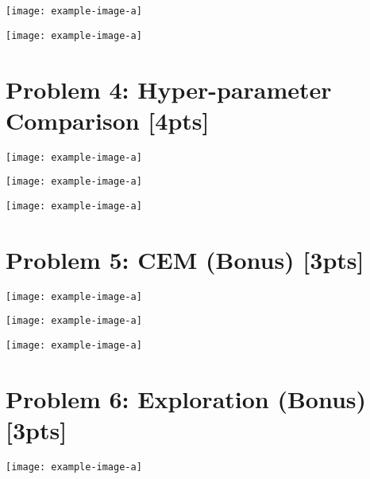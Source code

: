 \documentclass{article}
\begin{document}
\begin{answer}[title=Plot 2,height=9.5cm,width=\linewidth]
\centering
\texttt{[image: example-image-a]}
\end{answer}

\begin{answer}[title=Plot 3,height=9.5cm,width=\linewidth]
\centering
\texttt{[image: example-image-a]}
\end{answer}

\section{Problem 4: Hyper-parameter Comparison [4pts]}
\begin{answer}[title=Plot 1,height=9.5cm,width=\linewidth]
\centering
\texttt{[image: example-image-a]}
\end{answer}


\begin{answer}[title=Plot 2,height=9.5cm,width=\linewidth]
\centering
\texttt{[image: example-image-a]}
\end{answer}

\begin{answer}[title=Plot 3,height=9.5cm,width=\linewidth]
\centering
\texttt{[image: example-image-a]}
\end{answer}

\section{Problem 5: CEM (Bonus) [3pts]}
\begin{answer}[title=Plot 1,height=9.5cm,width=\linewidth]
\centering
\texttt{[image: example-image-a]}
\end{answer}

\begin{answer}[title=Plot 2,height=9.5cm,width=\linewidth]
\centering
\texttt{[image: example-image-a]}
\end{answer}

\begin{answer}[title=Plot 3,height=9.5cm,width=\linewidth]
\centering
\texttt{[image: example-image-a]}
\end{answer}

\section{Problem 6: Exploration (Bonus) [3pts]}
\begin{answer}[title=Plot 1,height=9.5cm,width=\linewidth]
\centering
\texttt{[image: example-image-a]}
\end{answer}
\end{document}
